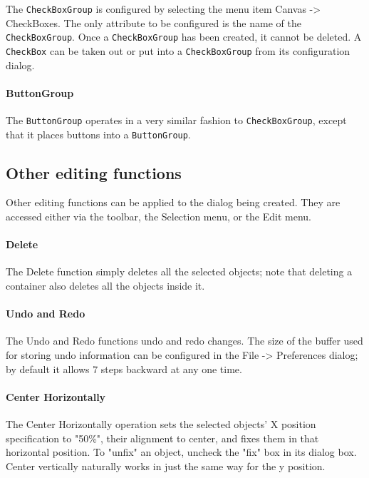 The \texttt{CheckBoxGroup} is configured by selecting the menu
item Canvas -{\textgreater} CheckBoxes. The only attribute to
be configured is the name of the \texttt{CheckBoxGroup}. Once
a \texttt{CheckBoxGroup} has been created, it cannot be deleted. A
\texttt{CheckBox} can be taken out or put into a \texttt{CheckBoxGroup}
from its configuration dialog.

\paragraph{ButtonGroup}
The \texttt{ButtonGroup} operates in a very similar fashion to
\texttt{CheckBoxGroup}, except that it places buttons into a
\texttt{ButtonGroup}.



\subsection{Other editing functions}

Other editing functions can be applied to
the dialog being created. They are accessed either via the toolbar,
the Selection menu, or the Edit menu.

\paragraph{Delete}
The Delete function simply deletes all the selected objects; note that
deleting a container also deletes all the objects inside it.

\paragraph{Undo and Redo}
The Undo and Redo functions undo and redo changes. The size of the
buffer used for storing undo information can be configured in the File
-{\textgreater} Preferences dialog; by default it allows 7 steps
backward at any one time.

\paragraph[Center Horizontally]{Center Horizontally}
The Center Horizontally operation sets the selected
objects' X position specification to
"50\%", their alignment to center, and
fixes them in that horizontal position. To
"unfix" an object, uncheck the
"fix" box in its dialog box. Center
vertically naturally works in just the same way for the y position.

